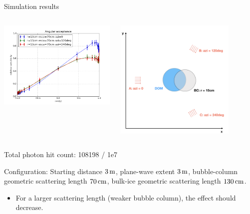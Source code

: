 \begin{frame}[fragile]{Simulation results}
  \begin{columns}
    \begin{column}{0.5\textwidth}
      \includegraphics[width=\textwidth]{img/summer_scenario_r15cm_esca70cm}
    \end{column}
    \begin{column}{0.5\textwidth}
      \includegraphics[width=0.8\textwidth]{img/summerscenario-004}
    \end{column}
  \end{columns}

  \tiny Total photon hit count: 108198 / 1e7

  \tiny Configuration: Starting distance $3\text{\,m}$, plane-wave extent $3\text{\,m}$, bubble-column geometric scattering length $70\text{\,cm}$, bulk-ice geometric scattering length $130\text{\,cm}$.
  \normalsize

  \begin{itemize}
    \item For a larger scattering length (weaker bubble column), the effect should decrease. \checkmark
  \end{itemize}
\end{frame}

